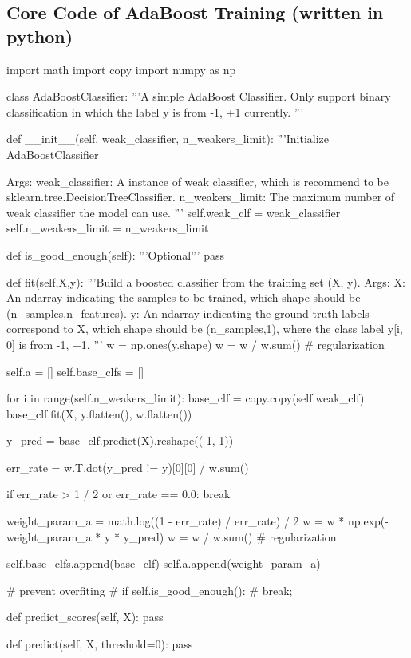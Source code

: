 \documentclass[journal, a4paper, onecolumn]{IEEEtran}
\begin{document}
\subsection{Core Code of AdaBoost Training (written in python)}

\begin{python} 
import math
import copy
import numpy as np

class AdaBoostClassifier:
    '''A simple AdaBoost Classifier.
    Only support binary classification in which the label y is from {-1, +1} currently.
    '''

    def __init__(self, weak_classifier, n_weakers_limit):
        '''Initialize AdaBoostClassifier

        Args:
            weak_classifier: A instance of weak classifier, 
            which is recommend to be sklearn.tree.DecisionTreeClassifier.
            n_weakers_limit: The maximum number of weak classifier the model can use.
        '''
        self.weak_clf = weak_classifier
        self.n_weakers_limit = n_weakers_limit

    def is_good_enough(self):
        '''Optional'''
        pass

    def fit(self,X,y):
        '''Build a boosted classifier from the training set (X, y).
        Args:
            X: An ndarray indicating the samples to be trained, 
            which shape should be (n_samples,n_features).
            y: An ndarray indicating the ground-truth labels 
               correspond to X, which shape should be (n_samples,1),
               where the class label y[i, 0] is from {-1, +1}.
        '''
        w = np.ones(y.shape)
        w = w / w.sum() # regularization

        self.a = []
        self.base_clfs = []

        for i in range(self.n_weakers_limit):
            base_clf = copy.copy(self.weak_clf)
            base_clf.fit(X, y.flatten(), w.flatten())

            y_pred = base_clf.predict(X).reshape((-1, 1))

            err_rate = w.T.dot(y_pred != y)[0][0] / w.sum()

            if err_rate > 1 / 2 or err_rate == 0.0:
                break

            weight_param_a = math.log((1 - err_rate) / err_rate) / 2
            w = w * np.exp(-weight_param_a * y * y_pred)
            w = w / w.sum() # regularization

            self.base_clfs.append(base_clf)
            self.a.append(weight_param_a)

            # prevent overfiting
            # if self.is_good_enough():
            #     break;

    def predict_scores(self, X):
        pass

    def predict(self, X, threshold=0):
        pass

\end{python}

\end{document}
